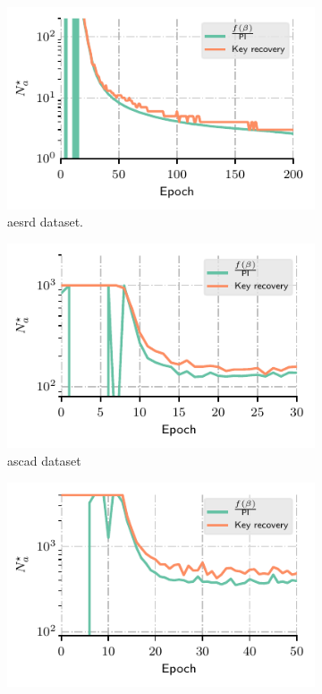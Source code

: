 \begin{figure}
    \centering
    \begin{subfigure}{0.49\textwidth}
        \includegraphics{Figures/experiments/RD_demo}
        \caption{\gls{aesrd} dataset.}
        \label{fig:ches_aes_rd}
    \end{subfigure}
    \begin{subfigure}{0.49\textwidth}
        \includegraphics{Figures/experiments/ASCAD_demo}
        \caption{\gls{ascad} dataset}
        \label{fig:ches_ascad}
    \end{subfigure}
    \begin{subfigure}{0.49\textwidth}
        \includegraphics{Figures/experiments/AES_HD_demo}

\end{subfigure}
\end{figure}
